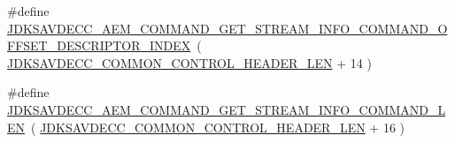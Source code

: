 \begin{DoxyCompactItemize}
\item 
\#define \hyperlink{group__command__get__stream__info_gafb7a734ce64b4f9832908a44e399a18a}{J\+D\+K\+S\+A\+V\+D\+E\+C\+C\+\_\+\+A\+E\+M\+\_\+\+C\+O\+M\+M\+A\+N\+D\+\_\+\+G\+E\+T\+\_\+\+S\+T\+R\+E\+A\+M\+\_\+\+I\+N\+F\+O\+\_\+\+C\+O\+M\+M\+A\+N\+D\+\_\+\+O\+F\+F\+S\+E\+T\+\_\+\+D\+E\+S\+C\+R\+I\+P\+T\+O\+R\+\_\+\+I\+N\+D\+EX}~( \hyperlink{group__jdksavdecc__avtp__common__control__header_gaae84052886fb1bb42f3bc5f85b741dff}{J\+D\+K\+S\+A\+V\+D\+E\+C\+C\+\_\+\+C\+O\+M\+M\+O\+N\+\_\+\+C\+O\+N\+T\+R\+O\+L\+\_\+\+H\+E\+A\+D\+E\+R\+\_\+\+L\+EN} + 14 )
\item 
\#define \hyperlink{group__command__get__stream__info_gaae48a0ac802bc8fdeaacfa15f4679e2a}{J\+D\+K\+S\+A\+V\+D\+E\+C\+C\+\_\+\+A\+E\+M\+\_\+\+C\+O\+M\+M\+A\+N\+D\+\_\+\+G\+E\+T\+\_\+\+S\+T\+R\+E\+A\+M\+\_\+\+I\+N\+F\+O\+\_\+\+C\+O\+M\+M\+A\+N\+D\+\_\+\+L\+EN}~( \hyperlink{group__jdksavdecc__avtp__common__control__header_gaae84052886fb1bb42f3bc5f85b741dff}{J\+D\+K\+S\+A\+V\+D\+E\+C\+C\+\_\+\+C\+O\+M\+M\+O\+N\+\_\+\+C\+O\+N\+T\+R\+O\+L\+\_\+\+H\+E\+A\+D\+E\+R\+\_\+\+L\+EN} + 16 )
\end{DoxyCompactItemize}
